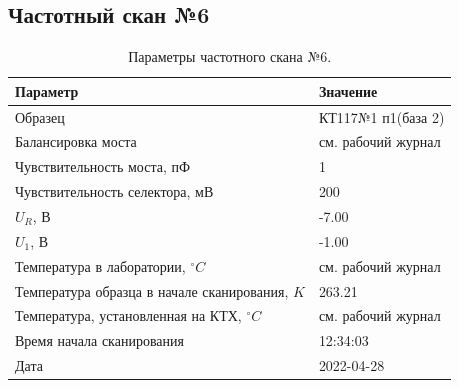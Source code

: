 \subsection{Частотный скан №6}
\begin{table}[!ht]
    \centering
    \caption{Параметры частотного скана №6.}
    \begin{tabular}{|l|l|}
        \hline
        Параметр                                       & Значение                  \\ \hline
        Образец                                        & КТ117№1 п1(база 2)        \\ \hline
        Балансировка моста                             & см. рабочий журнал        \\ \hline
        Чувствительность моста, пФ                     & 1                         \\ \hline
        Чувствительность селектора, мВ                 & 200                       \\ \hline
        $U_R$, В                                       & -7.00                     \\ \hline
        $U_1$, В                                       & -1.00                     \\ \hline
        Температура в лаборатории, $^\circ C$          & см. рабочий журнал        \\ \hline
        Температура образца в начале сканирования, $K$ & 263.21                    \\ \hline
        Температура, установленная на КТХ, $^\circ C$  & см. рабочий журнал        \\ \hline
        Время начала сканирования                      & 12:34:03                  \\ \hline
        Дата                                           & 2022-04-28                \\ \hline
    \end{tabular}
    \label{table:frequency_scan_6}
\end{table}

